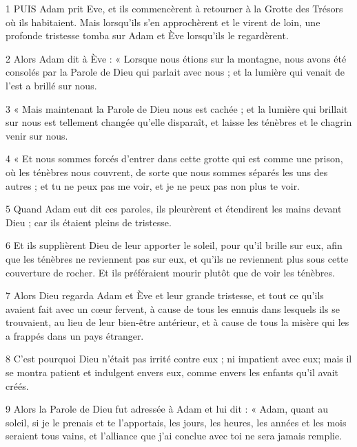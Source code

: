 \par 1 PUIS Adam prit Eve, et ils commencèrent à retourner à la Grotte des Trésors où ils habitaient. Mais lorsqu’ils s’en approchèrent et le virent de loin, une profonde tristesse tomba sur Adam et Ève lorsqu’ils le regardèrent.

\par 2 Alors Adam dit à Ève : « Lorsque nous étions sur la montagne, nous avons été consolés par la Parole de Dieu qui parlait avec nous ; et la lumière qui venait de l’est a brillé sur nous.

\par 3 « Mais maintenant la Parole de Dieu nous est cachée ; et la lumière qui brillait sur nous est tellement changée qu'elle disparaît, et laisse les ténèbres et le chagrin venir sur nous.

\par 4 « Et nous sommes forcés d'entrer dans cette grotte qui est comme une prison, où les ténèbres nous couvrent, de sorte que nous sommes séparés les uns des autres ; et tu ne peux pas me voir, et je ne peux pas non plus te voir.

\par 5 Quand Adam eut dit ces paroles, ils pleurèrent et étendirent les mains devant Dieu ; car ils étaient pleins de tristesse.

\par 6 Et ils supplièrent Dieu de leur apporter le soleil, pour qu'il brille sur eux, afin que les ténèbres ne reviennent pas sur eux, et qu'ils ne reviennent plus sous cette couverture de rocher. Et ils préféraient mourir plutôt que de voir les ténèbres.

\par 7 Alors Dieu regarda Adam et Ève et leur grande tristesse, et tout ce qu'ils avaient fait avec un cœur fervent, à cause de tous les ennuis dans lesquels ils se trouvaient, au lieu de leur bien-être antérieur, et à cause de tous la misère qui les a frappés dans un pays étranger.

\par 8 C'est pourquoi Dieu n'était pas irrité contre eux ; ni impatient avec eux; mais il se montra patient et indulgent envers eux, comme envers les enfants qu'il avait créés.

\par 9 Alors la Parole de Dieu fut adressée à Adam et lui dit : « Adam, quant au soleil, si je le prenais et te l'apportais, les jours, les heures, les années et les mois seraient tous vains, et l’alliance que j’ai conclue avec toi ne sera jamais remplie.


